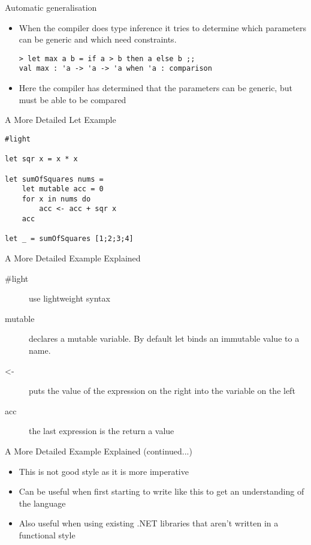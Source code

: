 \documentclass[landscape]{slides}
\begin{document}
\begin{slide}{Automatic generalisation}
\begin{itemize}
\item When the compiler does type inference it tries to determine which parameters can be generic and which need constraints.
\begin{verbatim}
> let max a b = if a > b then a else b ;;
val max : 'a -> 'a -> 'a when 'a : comparison
\end{verbatim}
\item Here the compiler has determined that the parameters can be generic, but must be able to be compared
\end{itemize}
\end{slide}

\begin{slide}{A More Detailed Let Example}
\begin{verbatim}
#light

let sqr x = x * x

let sumOfSquares nums =
    let mutable acc = 0
    for x in nums do
        acc <- acc + sqr x
    acc

let _ = sumOfSquares [1;2;3;4]
\end{verbatim}
\end{slide}

\begin{slide}{A More Detailed Example Explained}
\begin{description}
\item[\#light] use lightweight syntax
\item[mutable] declares a mutable variable. By default let binds an immutable value to a name.
\item[\textless-] puts the value of the expression on the right into the variable on the left
\item[acc] the last expression is the return a value
\end{description}
\end{slide}

\begin{slide}{A More Detailed Example Explained (continued...)}
\begin{itemize}
\item This is not good style as it is more imperative
\item Can be useful when first starting to write like this to get an understanding of the language
\item Also useful when using existing .NET libraries that aren't written in a functional style
\end{itemize}
\end{slide}
\end{document}

